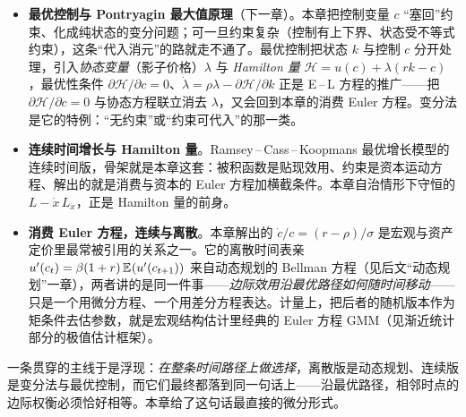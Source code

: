 \begin{itemize}
    \item \textbf{最优控制与 Pontryagin 最大值原理}（下一章）。本章把控制变量 $c$ ``塞回''约束、化成纯状态的变分问题；可一旦约束复杂（控制有上下界、状态受不等式约束），这条``代入消元''的路就走不通了。最优控制把状态 $k$ 与控制 $c$ 分开处理，引入\emph{协态变量}（影子价格）$\lambda$ 与 \emph{Hamilton 量} $\mathcal H=u(c)+\lambda(rk-c)$，最优性条件 $\partial\mathcal H/\partial c=0$、$\dot\lambda=\rho\lambda-\partial\mathcal H/\partial k$ 正是 E\,–\,L 方程的推广——把 $\partial\mathcal H/\partial c=0$ 与协态方程联立消去 $\lambda$，又会回到本章的消费 Euler 方程。变分法是它的特例：``无约束''或``约束可代入''的那一类。
    \item \textbf{连续时间增长与 Hamilton 量}。Ramsey\,–\,Cass\,–\,Koopmans 最优增长模型的连续时间版，骨架就是本章这套：被积函数是贴现效用、约束是资本运动方程、解出的就是消费与资本的 Euler 方程加横截条件。本章自治情形下守恒的 $L-\dot x\,L_{\dot x}$，正是 Hamilton 量的前身。
    \item \textbf{消费 Euler 方程，连续与离散}。本章解出的 $\dot c/c=(r-\rho)/\sigma$ 是宏观与资产定价里最常被引用的关系之一。它的离散时间表亲 $u'(c_t)=\beta(1+r)\,\mathbb{E}_{}\!\left(u'(c_{t+1})\right)$ 来自动态规划的 Bellman 方程（见后文``动态规划''一章），两者讲的是同一件事——\emph{边际效用沿最优路径如何随时间移动}——只是一个用微分方程、一个用差分方程表达。计量上，把后者的随机版本作为矩条件去估参数，就是宏观结构估计里经典的 Euler 方程 GMM（见渐近统计部分的极值估计框架）。
\end{itemize}

一条贯穿的主线于是浮现：\emph{在整条时间路径上做选择}，离散版是动态规划、连续版是变分法与最优控制，而它们最终都落到同一句话上——沿最优路径，相邻时点的边际权衡必须恰好相等。本章给了这句话最直接的微分形式。
